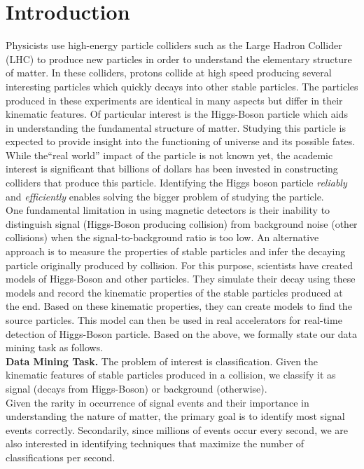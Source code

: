 \section{Introduction}
\label{sec:introduction}

Physicists use high-energy particle colliders such as the Large Hadron Collider (LHC) to produce new particles in order to understand the elementary structure of matter. In these colliders, protons collide at high speed producing several interesting particles which quickly decays into other stable particles. The particles produced in these experiments are identical in many aspects but differ in their kinematic features. Of particular interest is the Higgs-Boson particle which aids in understanding the fundamental structure of matter. Studying this particle is expected to provide insight into the functioning of universe and its possible fates. While the``real world'' impact of the particle is not known yet, the academic interest is significant that billions of dollars has been invested in constructing colliders that produce this particle. Identifying the Higgs boson particle \emph{reliably} and \emph{efficiently} enables solving the bigger problem of studying the particle. \\

One fundamental limitation in using magnetic detectors is their inability to distinguish signal (Higgs-Boson producing collision) from background noise (other collisions) when the signal-to-background ratio is too low. An alternative approach is to measure the properties of stable particles and infer the decaying particle originally produced by collision. For this purpose, scientists have created models of Higgs-Boson and other particles. They simulate their decay using these models and record the kinematic properties of the stable particles produced at the end. Based on these kinematic properties, they can create models to find the source particles. This model can then be used in real accelerators for real-time detection of Higgs-Boson particle. Based on the above, we formally state our data mining task as follows.\\

\textbf{Data Mining Task.} The problem of interest is classification. Given the kinematic features of stable particles produced in a collision, we classify it as signal (decays from Higgs-Boson) or background (otherwise).\\

Given the rarity in occurrence of signal events and their importance in understanding the nature of matter, the primary goal is to identify most signal events correctly. Secondarily, since millions of events occur every second, we are also interested in identifying techniques that maximize the number of classifications per second. \\

